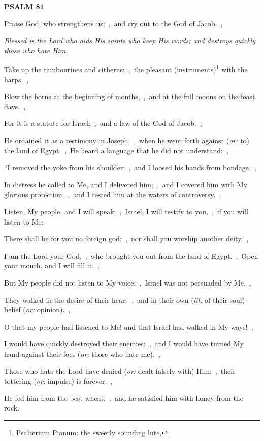 \documentclass[12pt,twoside,a5paper]{article}
\newcommand{\psalm}[1]{\textbf{PSALM {#1}}\nopagebreak}
\newcommand{\qanona}[1]{{\liturgicalhint{Qanona.} \emph{#1}}}
\newcommand{\translationoption}[1]{\emph{or:} #1}
\newcommand{\translationliteral}[1]{\emph{lit.} #1}
\begin{document}
\psalm{81}

\begin{normalparskip}
  Praise God, who strengthens us;~\sep\ and cry out to the God of Jacob.~\sep

  \qanona{Blessed is the Lord who aids His saints who keep His words; and destroys quickly those who hate Him.}

  Take up the tambourines and citherns;~\sep\ the pleasant (instruments)\footnote{Psalterium Pianum: the sweetly sounding lute.} with the harps.~\sep

  Blow the horns at the beginning of months,~\sep\ and at the full moons on the feast days.~\sep

  For it is a statute for Israel;~\sep\ and a law of the God of Jacob.~\sep

  He ordained it as a testimony in Joseph,~\sep\ when he went forth against (\translationoption{to}) the land of Egypt.~\sep\ He heard a language that he did not understand:~\sep

  ``I removed the yoke from his shoulder;~\sep\ and I loosed his hands from bondage.~\sep

  In distress he called to Me, and I delivered him;~\sep\ and I covered him with My glorious protection.~\sep\ and I tested him at the waters of controversy.~\sep

  Listen, My people, and I will speak;~\sep\ Israel, I will testify to you,~\sep\ if you will listen to Me:

  There shall be for you no foreign god;~\sep\ nor shall you worship another deity.~\sep

  I am the Lord your God,~\sep\ who brought you out from the land of Egypt.~\sep\ Open your mouth, and I will fill it.~\sep

  But My people did not listen to My voice;~\sep\ Israel was not persuaded by Me.~\sep

  They walked in the desire of their heart~\sep\ and in their own (\translationliteral{of their soul}) belief (\translationoption{opinion}).~\sep

  O that my people had listened to Me! and that Israel had walked in My ways!~\sep

  I would have quickly destroyed their enemies;~\sep\ and I would have turned My hand against their foes (\translationoption{those who hate me}).~\sep

  Those who hate the Lord have denied (\translationoption{dealt falsely with}) Him;~\sep\ their tottering (\translationoption{impulse}) is forever.~\sep

  He fed him from the best wheat;~\sep\ and he satisfied him with honey from the rock.
\end{normalparskip}
\end{document}
